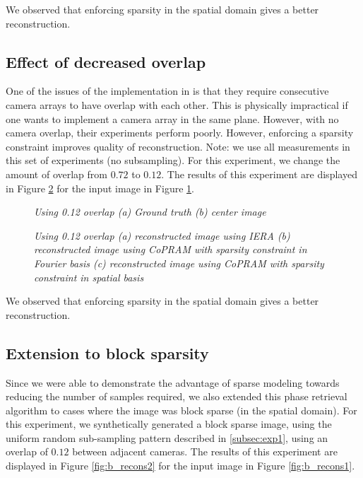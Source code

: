\documentclass{article} %
\begin{document}
We observed that enforcing sparsity in the spatial domain gives a better reconstruction.
\subsection{Effect of decreased overlap}

One of the issues of the implementation in \cite{holloway2016toward} is that they require consecutive camera arrays to have overlap with each other. This is physically impractical if one wants to implement a camera array in the same plane. However, with no camera overlap, their experiments perform poorly. However, enforcing a sparsity constraint improves quality of reconstruction. Note: we use all measurements in this set of experiments (no subsampling). For this experiment, we change the amount of overlap from $0.72$ to $0.12$. The results of this experiment are displayed in Figure \ref{fig:o_recons2} for the input image in Figure \ref{fig:o_recons1}.

\begin{figure}[!t]
	\centering
	\subfloat[][Initial, SSIM=0.3674]{\texttt{[image: O1IN]}}
	\caption{\sl Using 0.12 overlap (a) Ground truth (b) center image } \label{fig:o_recons1}
\end{figure}


\begin{figure}[!h]
	\centering
	\subfloat[][IERA, SSIM=0.3088]{\texttt{[image: O1AM]}} 
	\subfloat[][Fourier, SSIM=0.3446]{\texttt{[image: O1FS]}} 
	\subfloat[][Spatial, SSIM=0.6124]{\texttt{[image: O1SS]}}
	\caption{\sl Using 0.12 overlap (a) reconstructed image using IERA (b) reconstructed image using CoPRAM with sparsity constraint in Fourier basis (c) reconstructed image using CoPRAM with sparsity constraint in spatial basis} \label{fig:o_recons2}
\end{figure}

We observed that enforcing sparsity in the spatial domain gives a better reconstruction.
\newpage
\subsection{Extension to block sparsity}
Since we were able to demonstrate the advantage of sparse modeling towards reducing the number of samples required, we also extended this phase retrieval algorithm to cases where the image was block sparse (in the spatial domain). For this experiment, we synthetically generated a block sparse image, using the uniform random sub-sampling pattern described in \ref{subsec:exp1}, using an overlap of $0.12$ between adjacent cameras. The results of this experiment are displayed in Figure \ref{fig:b_recons2} for the input image in Figure \ref{fig:b_recons1}.
\end{document}
